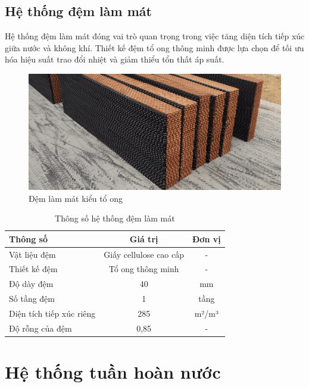 \documentclass[../main.tex]{subfiles}
\begin{document}
\subsection{Hệ thống đệm làm mát}
\label{sec:fill_system}

Hệ thống đệm làm mát đóng vai trò quan trọng trong việc tăng diện tích tiếp xúc giữa nước và không khí. Thiết kế đệm tổ ong thông minh được lựa chọn để tối ưu hóa hiệu suất trao đổi nhiệt và giảm thiểu tổn thất áp suất.

\begin{figure} [H]
    \centering
    \includegraphics[width=1\textwidth]{Hinhve/cooling_pad.png}
    \caption{Đệm làm mát kiểu tổ ong}
    \label{fig:de_mat}
\end{figure}

\begin{table}[H]
\centering
\renewcommand{\arraystretch}{1.1}
\caption{Thông số hệ thống đệm làm mát}
\label{tab:fill_specs}
\begin{tabular}{|l|c|c|}
\hline
\textbf{Thông số} & \textbf{Giá trị} & \textbf{Đơn vị} \\
\hline
Vật liệu đệm & Giấy cellulose cao cấp & - \\
\hline
Thiết kế đệm & Tổ ong thông minh & - \\
\hline
Độ dày đệm & 40 & mm \\
\hline
Số tầng đệm & 1 & tầng \\
\hline
Diện tích tiếp xúc riêng & 285 & m²/m³ \\
\hline
Độ rỗng của đệm & 0,85 & - \\
\hline
\end{tabular}
\end{table}

\section{Hệ thống tuần hoàn nước}
\label{sec:water_circulation_system}
\end{document}
